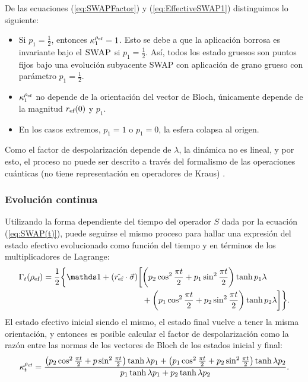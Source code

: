 De las ecuaciones (\ref{eq:SWAPFactor}) y (\ref{eq:EffectiveSWAP1}) distinguimos lo siguiente:
\begin{itemize}
  \item Si $p_{1}=\frac{1}{2}$, entonces $\kappa_{1}^{\rho_{\text{ef}}}=1$. Esto se debe a que la aplicación borrosa es invariante bajo el $\textsc{SWAP}$ si $p_{1}=\frac{1}{2}$. Así, todos los estado gruesos son puntos fijos bajo una evolución subyacente SWAP con aplicación de grano grueso con parámetro $p_{1}=\frac{1}{2}$.
  \item $\kappa_{1}^{\rho_{\text{ef}}}$ no depende de la orientación del vector de Bloch, únicamente depende de la magnitud $r_{\text{ef}}(0)$ y $p_{1}$.
  \item En los casos extremos, $p_{1}=1$ o $p_{1}=0$, la esfera colapsa al origen.
\end{itemize}


Como el factor de despolarización depende de $\lambda$, la dinámica no es lineal, y por esto, el proceso no puede ser descrito a través del formalismo de las operaciones cuánticas (no tiene representación en operadores de Kraus) \cite{Chuang}.

\subsubsection{Evolución continua}

Utilizando la forma dependiente del tiempo del operador $S$ dada por la ecuación (\ref{eq:SWAP(t)}), puede seguirse el mismo proceso para hallar una expresión del estado efectivo evolucionado como función del tiempo y en términos de los multiplicadores de Lagrange:
\begin{align}
  \begin{split}
  \Gamma_{t}(\rho_{\ef})=\frac{1}{2}\bigg\{\Id+(\hat{r_{\ef}}\cdot\vec{\sigma})\bigg[&\qty(p_{2}\cos^{2}{\frac{\pi t}{2}}+p_{1}\sin^{2}{\frac{\pi t}{2}})\tanh{p_{1}\lambda}\\
  &+\qty(p_{1}\cos^{2}{\frac{\pi t}{2}}+p_{2}\sin^{2}{\frac{\pi t}{2}})\tanh{p_{2}\lambda}\bigg]\bigg\}.
  \end{split}
\end{align}
El estado efectivo inicial siendo el mismo, el estado final vuelve a tener la misma orientación, y entonces es posible calcular el factor de despolarización como la razón entre las normas de los vectores de Bloch de los estados inicial y final:
\begin{equation}\label{eq:SWAPFactort}
  \kappa_{t}^{\rho_{\text{ef}}}=\frac{\qty(p_{2}\cos^{2}{\frac{\pi t}{2}}+p\sin^{2}{\frac{\pi t}{2}})\tanh{\lambda p_{1}}+\qty(p_{1}\cos^{2}{\frac{\pi t}{2}}+p_{2}\sin^{2}{\frac{\pi t}{2}})\tanh{\lambda p_{2}}}{
    p_{1}\tanh{\lambda p_{1}}+p_{2}\tanh{\lambda p_{2}}}.
\end{equation}

